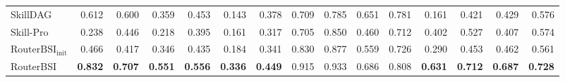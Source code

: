 \begin{table}[!htbp]
\begin{tabular*}{\linewidth}{@{\extracolsep{\fill}}lrrrrrrrrrrrrrr}
SkillDAG & 0.612 & 0.600 & 0.359 & 0.453 & 0.143 & 0.378 & 0.709 & 0.785 & 0.651 & 0.781 & 0.161 & 0.421 & 0.429 & 0.576 \\
Skill-Pro & 0.238 & 0.446 & 0.218 & 0.395 & 0.161 & 0.317 & 0.705 & 0.850 & 0.460 & 0.712 & 0.402 & 0.527 & 0.407 & 0.574 \\
$\mathrm{RouterBSI}_{\mathrm{init}}$ & 0.466 & 0.417 & 0.346 & 0.435 & 0.184 & 0.341 & 0.830 & 0.877 & 0.559 & 0.726 & 0.290 & 0.453 & 0.462 & 0.561 \\
RouterBSI & \textbf{0.832} & \textbf{0.707} & \textbf{0.551} & \textbf{0.556} & \textbf{0.336} & \textbf{0.449} & 0.915 & 0.933 & 0.686 & 0.808 & \textbf{0.631} & \textbf{0.712} & \textbf{0.687} & \textbf{0.728} \\
\bottomrule
\end{tabular*}
\end{table}
